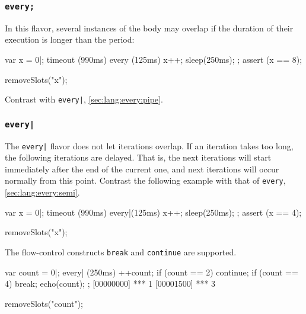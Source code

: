 
\subsubsection{\lstinline{every;}}
\label{sec:lang:every:semi}

In this flavor, several instances of the body may overlap if the duration of
their execution is longer than the period:

\begin{urbiscript}
var x = 0|;
timeout (990ms)
  every (125ms)
  {
    x++;
    sleep(250ms);
  };
assert (x == 8);
\end{urbiscript}
\begin{urbicomment}
removeSlots("x");
\end{urbicomment}

Contrast with \lstinline{every|}, \autoref{sec:lang:every:pipe}.

\subsubsection{\lstinline{every|}}
\label{sec:lang:every:pipe}

The \lstinline{every|} flavor does not let iterations overlap. If an
iteration takes too long, the following iterations are delayed. That is, the
next iterations will start immediately after the end of the current one, and
next iterations will occur normally from this point.  Contrast the following
example with that of \lstinline{every}, \autoref{sec:lang:every:semi}.

\begin{urbiscript}
var x = 0|;
timeout (990ms)
  every|(125ms)
  {
    x++;
    sleep(250ms);
  };
assert (x == 4);
\end{urbiscript}
\begin{urbicomment}
removeSlots("x");
\end{urbicomment}

The flow-control constructs \lstinline{break} and \lstinline{continue}
are supported.

\begin{urbiscript}
var count = 0|;
every| (250ms)
{
  ++count;
  if (count == 2)
    continue;
  if (count == 4)
    break;
  echo(count);
};
[00000000] *** 1
[00001500] *** 3
\end{urbiscript}
\begin{urbicomment}
removeSlots("count");
\end{urbicomment}



